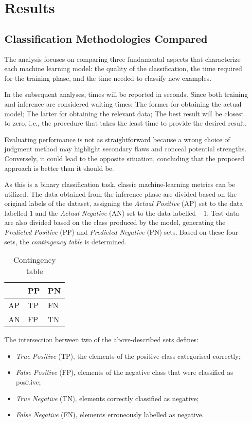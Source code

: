 \chapter{Results}

\section{Classification Methodologies Compared}\label{sec:qsvm-res}

The analysis focuses on comparing three fundamental aspects that characterize each machine learning model: the quality of the classification, the time required for the training phase, and the time needed to classify new examples.

In the subsequent analyses, times will be reported in seconds. Since both training and inference are considered waiting times: The former for obtaining the actual model; The latter for obtaining the relevant data; The best result will be closest to zero, i.e., the procedure that takes the least time to provide the desired result.

Evaluating performance is not as straightforward because a wrong choice of judgment method may highlight secondary flaws and conceal potential strengths. Conversely, it could lead to the opposite situation, concluding that the proposed approach is better than it should be.

As this is a binary classification task, classic machine-learning metrics can be utilized. The data obtained from the inference phase are divided based on the original labels of the dataset, assigning the \emph{Actual Positive} (AP) set to the data labelled $1$ and the \emph{Actual Negative} (AN) set to the data labelled $-1$. Test data are also divided based on the class produced by the model, generating the \emph{Predicted Positive} (PP) and \emph{Predicted Negative} (PN) sets. Based on these four sets, the \emph{contingency table} is determined.

\begin{table}[H]
    \centering
    \begin{tabular}{l|ll}
       & PP & PN \\\hline
    AP & TP & FN \\
    AN & FP & TN
    \end{tabular}
    \caption{Contingency table}
\end{table}

The intersection between two of the above-described sets defines:
\begin{itemize}
    \item \emph{True Positive} (TP), the elements of the positive class categorised correctly;
    \item \emph{False Positive} (FP), elements of the negative class that were classified as positive;
    \item \emph{True Negative} (TN), elements correctly classified as negative;
    \item \emph{False Negative} (FN), elements erroneously labelled as negative.
\end{itemize}

